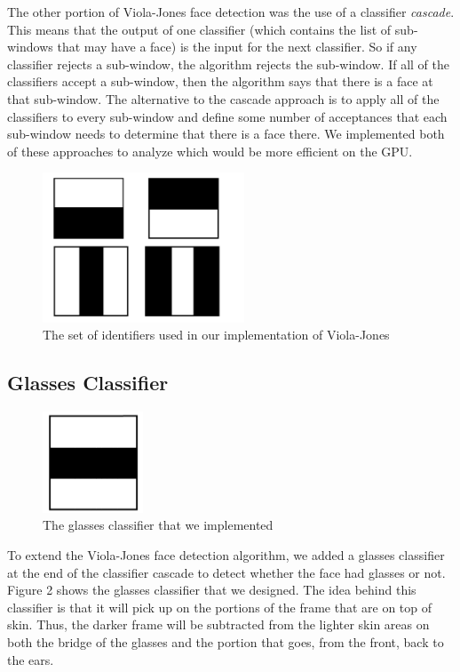 \documentclass[12pt] {article}
\begin{document}
The other portion of Viola-Jones face detection was the use of a classifier \emph{cascade}. This means that the output of one classifier (which contains the list of sub-windows that may have a face) is the input for the next classifier. So if any classifier rejects a sub-window, the algorithm rejects the sub-window. If all of the classifiers accept a sub-window, then the algorithm says that there is a face at that sub-window. The alternative to the cascade approach is to apply all of the classifiers to every sub-window and define some number of acceptances that each sub-window needs to determine that there is a face there. We implemented both of these approaches to analyze which would be more efficient on the GPU.
\begin{figure}[h!]
	\centering
		\includegraphics[width=60mm]{classifiers.pdf}
		\caption{The set of identifiers used in our implementation of Viola-Jones}
\end{figure}


\subsection{Glasses Classifier}
\begin{figure}[h!]
	\centering
		\includegraphics[width=30mm]{glasses_identifier.pdf}
		\caption{The glasses classifier that we implemented}
\end{figure}
To extend the Viola-Jones face detection algorithm, we added a glasses classifier at the end of the classifier cascade to detect whether the face had glasses or not. Figure 2 shows the glasses classifier that we designed. The idea behind this classifier is that it will pick up on the portions of the frame that are on top of skin. Thus, the darker frame will be subtracted from the lighter skin areas on both the bridge of the glasses and the portion that goes, from the front, back to the ears.
\end{document}
